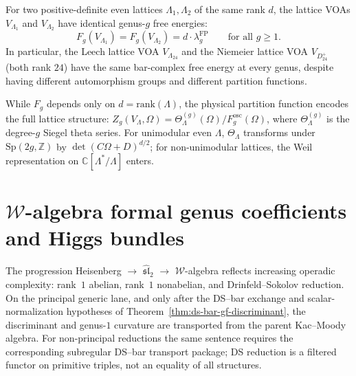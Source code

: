 \begin{corollary}
For two positive-definite even lattices $\Lambda_1, \Lambda_2$ of the same rank $d$, the lattice VOAs $V_{\Lambda_1}$ and $V_{\Lambda_2}$ have identical genus-$g$ free energies:
\[
F_g(V_{\Lambda_1}) = F_g(V_{\Lambda_2}) = d \cdot \lambda_g^{\mathrm{FP}}
\qquad \text{for all } g \geq 1.
\]
In particular, the Leech lattice VOA $V_{\Lambda_{24}}$ and the Niemeier lattice VOA $V_{D_{24}^+}$ (both rank $24$) have the same bar-complex free energy at every genus, despite having different automorphism groups and different partition functions.
\end{corollary}

\begin{remark}

While $F_g$ depends only on $d = \mathrm{rank}(\Lambda)$, the physical partition function encodes the full lattice structure: $Z_g(V_\Lambda, \Omega) = \Theta_\Lambda^{(g)}(\Omega)/F_g^{\mathrm{osc}}(\Omega)$, where $\Theta_\Lambda^{(g)}$ is the degree-$g$ Siegel theta series. For unimodular even $\Lambda$, $\Theta_\Lambda$ transforms under $\mathrm{Sp}(2g, \mathbb{Z})$ by $\det(C\Omega + D)^{d/2}$; for non-unimodular lattices, the Weil representation on $\mathbb{C}[\Lambda^*/\Lambda]$ enters.
\end{remark}

\section{\texorpdfstring{$\mathcal{W}$-algebra formal genus coefficients and Higgs bundles}{$\mathcal{W}$-algebra formal genus coefficients and Higgs bundles}}

The progression Heisenberg $\to$ $\widehat{\mathfrak{sl}}_2$ $\to$ $\mathcal{W}$-algebra reflects increasing operadic complexity: rank~$1$ abelian, rank~$1$ nonabelian, and Drinfeld--Sokolov reduction. On the principal generic lane, and only after the DS--bar exchange and scalar-normalization hypotheses of Theorem~\ref{thm:ds-bar-gf-discriminant}, the discriminant and genus-$1$ curvature are transported from the parent Kac--Moody algebra. For non-principal reductions the same sentence requires the corresponding subregular DS--bar transport package; DS reduction is a filtered functor on primitive triples, not an equality of all structures.

